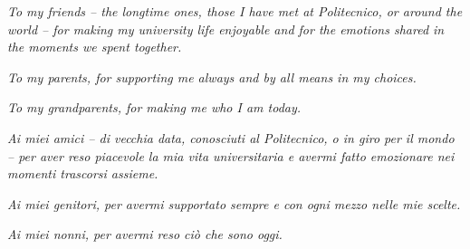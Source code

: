 \vspace{17cm}

\hfill
\begin{minipage}[t]{0.7\textwidth}
\begin{flushright}
\textit{To my friends -- the longtime ones, those I have met at Politecnico, or around the world -- for making my university life enjoyable and for the emotions shared in the moments we spent together.}\vspace{5mm}

\textit{To my parents, for supporting me always and by all means in my choices.}\vspace{5mm}

\textit{To my grandparents, for making me who I am today.}\vspace{2cm}

\textit{Ai miei amici -- di vecchia data, conosciuti al Politecnico, o in giro per il mondo -- per aver reso piacevole la mia vita universitaria e avermi fatto emozionare nei momenti trascorsi assieme.}\vspace{5mm}

\textit{Ai miei genitori, per avermi supportato sempre e con ogni mezzo nelle mie scelte.}\vspace{5mm}

\textit{Ai miei nonni, per avermi reso ci\`{o} che sono oggi.}
\end{flushright}
\end{minipage}
